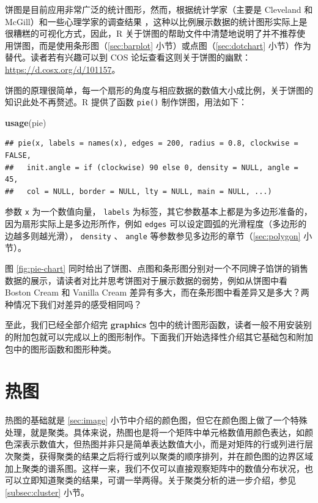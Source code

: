 \documentclass[
  b5paper,
  UTF8,twoside]{book}
\newenvironment{Shaded}{\begin{snugshade}}{\end{snugshade}}
\newcommand{\FunctionTok}[1]{\textcolor[rgb]{0.13,0.29,0.53}{\textbf{#1}}}
\newcommand{\NormalTok}[1]{#1}
\begin{document}
饼图是目前应用非常广泛的统计图形，然而，根据统计学家（主要是 Cleveland 和 McGill）和一些心理学家的调查结果 \citep{Cleveland85}，这种以比例展示数据的统计图形实际上是很糟糕的可视化方式，因此，R 关于饼图的帮助文件中清楚地说明了并不推荐使用饼图，而是使用条形图（\ref{sec:barplot} 小节）或点图（\ref{sec:dotchart} 小节）作为替代。读者若有兴趣可以到 COS 论坛查看这则关于饼图的幽默：\url{https://d.cosx.org/d/101157}。

饼图的原理很简单，每一个扇形的角度与相应数据的数值大小成比例，关于饼图的知识此处不再赘述。R 提供了函数 \texttt{pie()} 制作饼图，用法如下：

\begin{Shaded}
\begin{Highlighting}[]
\FunctionTok{usage}\NormalTok{(pie)}
\end{Highlighting}
\end{Shaded}

\begin{verbatim}
## pie(x, labels = names(x), edges = 200, radius = 0.8, clockwise = FALSE,
##   init.angle = if (clockwise) 90 else 0, density = NULL, angle = 45,
##   col = NULL, border = NULL, lty = NULL, main = NULL, ...)
\end{verbatim}

参数 \texttt{x} 为一个数值向量， \texttt{labels} 为标签，其它参数基本上都是为多边形准备的，因为扇形实际上是多边形所作，例如 \texttt{edges} 可以设定圆弧的光滑程度（多边形的边越多则越光滑）， \texttt{density} 、 \texttt{angle} 等参数参见多边形的章节（\ref{sec:polygon} 小节）。

图 \ref{fig:pie-chart} 同时给出了饼图、点图和条形图分别对一个不同牌子馅饼的销售数据的展示，请读者对比并思考饼图对于展示数据的弱势，例如从饼图中看 Boston Cream 和 Vanilla Cream 差异有多大，而在条形图中看差异又是多大？两种情况下我们对差异的感受相同吗？

至此，我们已经全部介绍完 \textbf{graphics} 包中的统计图形函数，读者一般不用安装别的附加包就可以完成以上的图形制作。下面我们开始选择性介绍其它基础包和附加包中的图形函数和图形种类。

\section{热图}\label{ux70edux56fe}

热图的基础就是 \ref{sec:image} 小节中介绍的颜色图，但它在颜色图上做了一个特殊处理，就是聚类。具体来说，热图也是将一个矩阵中单元格数值用颜色表达，如颜色深表示数值大，但热图并非只是简单表达数值大小，而是对矩阵的行或列进行层次聚类，获得聚类的结果之后将行或列以聚类的顺序排列，并在颜色图的边界区域加上聚类的谱系图。这样一来，我们不仅可以直接观察矩阵中的数值分布状况，也可以立即知道聚类的结果，可谓一举两得。关于聚类分析的进一步介绍，参见 \ref{subsec:cluster}
小节。
\end{document}
